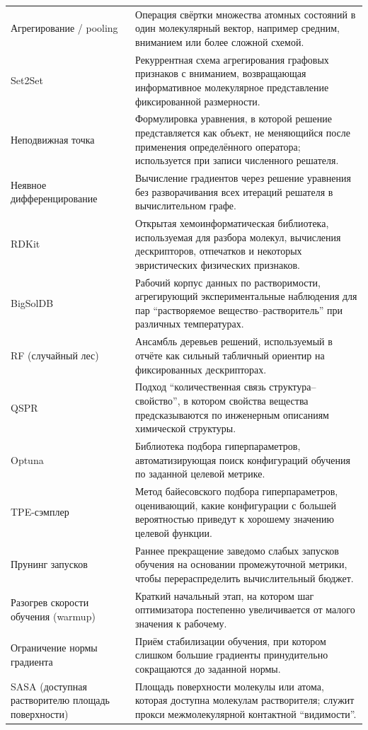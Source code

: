 \documentclass[11pt]{article}
\begin{document}
\begin{longtable}{p{}p{}}
Агрегирование / pooling & Операция свёртки множества атомных состояний в один молекулярный вектор, например средним, вниманием или более сложной схемой. \\
Set2Set & Рекуррентная схема агрегирования графовых признаков с вниманием, возвращающая информативное молекулярное представление фиксированной размерности. \\
Неподвижная точка & Формулировка уравнения, в которой решение представляется как объект, не меняющийся после применения определённого оператора; используется при записи численного решателя. \\
Неявное дифференцирование & Вычисление градиентов через решение уравнения без разворачивания всех итераций решателя в вычислительном графе. \\
RDKit & Открытая хемоинформатическая библиотека, используемая для разбора молекул, вычисления дескрипторов, отпечатков и некоторых эвристических физических признаков. \\
BigSolDB & Рабочий корпус данных по растворимости, агрегирующий экспериментальные наблюдения для пар ``растворяемое вещество--растворитель'' при различных температурах. \\
RF (случайный лес) & Ансамбль деревьев решений, используемый в отчёте как сильный табличный ориентир на фиксированных дескрипторах. \\
QSPR & Подход ``количественная связь структура--свойство'', в котором свойства вещества предсказываются по инженерным описаниям химической структуры. \\
Optuna & Библиотека подбора гиперпараметров, автоматизирующая поиск конфигураций обучения по заданной целевой метрике. \\
TPE-сэмплер & Метод байесовского подбора гиперпараметров, оценивающий, какие конфигурации с большей вероятностью приведут к хорошему значению целевой функции. \\
Прунинг запусков & Раннее прекращение заведомо слабых запусков обучения на основании промежуточной метрики, чтобы перераспределить вычислительный бюджет. \\
Разогрев скорости обучения (warmup) & Краткий начальный этап, на котором шаг оптимизатора постепенно увеличивается от малого значения к рабочему. \\
Ограничение нормы градиента & Приём стабилизации обучения, при котором слишком большие градиенты принудительно сокращаются до заданной нормы. \\
SASA (доступная растворителю площадь поверхности) & Площадь поверхности молекулы или атома, которая доступна молекулам растворителя; служит прокси межмолекулярной контактной ``видимости''. \\

\end{longtable}
\end{document}
